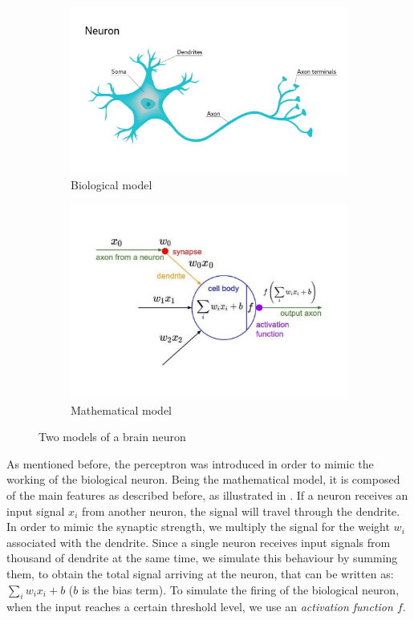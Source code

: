 \documentclass[12pt,a4paper]{report}
\theoremstyle{definition}
\begin{document}
\begin{figure}[h]
\centering
\begin{subfigure}{.5\textwidth}
  \centering
  \includegraphics[width=0.9\linewidth]{./Images/neuron.pdf}
  \caption{Biological model}
  \label{fig:biological_model}
\end{subfigure}%
\begin{subfigure}{.5\textwidth}
  \centering
  \includegraphics[trim={0 2.2cm 0 0}, clip,width=0.9\linewidth]{./Images/perceptron_stanford.pdf}
  \caption{Mathematical model}
  \label{fig:math_model}
\end{subfigure}
\caption{Two models of a brain neuron}
\label{fig:neuron_models}
\end{figure}

As mentioned before, the perceptron was introduced in order to mimic the working of the biological neuron. Being the mathematical model, it is composed of the main features as described before, as illustrated in .
If a neuron receives an input signal $x_i$ from another neuron, the signal will travel through the dendrite.
In order to mimic the synaptic strength, we multiply the signal for the weight $w _i$ associated with the dendrite.
Since a single neuron receives input signals from thousand of dendrite at the same time, we simulate this behaviour by summing them, to obtain the total signal arriving at the neuron, that can be written as: $\sum_i w_i x_i + b$ ($b$ is the bias term).
To simulate the firing of the biological neuron, when the input reaches a certain threshold level, we use an \emph{activation function $f$}.
\end{document}
